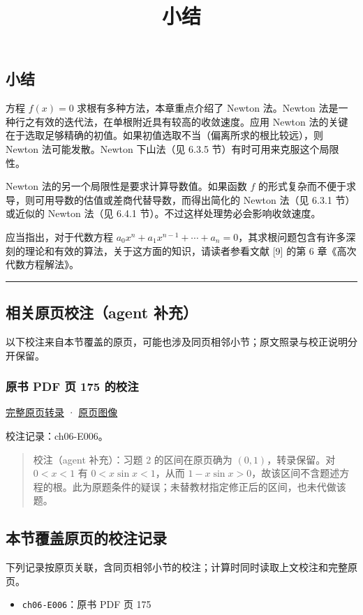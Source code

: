 \documentclass[
  10pt,
  fontset=fandol]{ctexart}
\title{小结}
\author{}
\date{}
\providecommand{\tightlist}{%
  \setlength{\itemsep}{0pt}\setlength{\parskip}{0pt}}
\begin{document}
\maketitle

\subsection{小结}\label{ux5c0fux7ed3}

方程 \(f(x)=0\) 求根有多种方法，本章重点介绍了 Newton 法。Newton 法是一种行之有效的迭代法，在单根附近具有较高的收敛速度。应用 Newton 法的关键在于选取足够精确的初值。如果初值选取不当（偏离所求的根比较远），则 Newton 法可能发散。Newton 下山法（见 6.3.5 节）有时可用来克服这个局限性。

Newton 法的另一个局限性是要求计算导数值。如果函数 \(f\) 的形式复杂而不便于求导，则可用导数的估值或差商代替导数，而得出简化的 Newton 法（见 6.3.1 节）或近似的 Newton 法（见 6.4.1 节）。不过这样处理势必会影响收敛速度。

应当指出，对于代数方程 \(a_0x^n+a_1x^{n-1}+\cdots+a_n=0\)，其求根问题包含有许多深刻的理论和有效的算法，关于这方面的知识，请读者参看文献 {[}9{]} 的第 6 章《高次代数方程解法》。

\begin{center}\rule{0.5\linewidth}{0.5pt}\end{center}

\subsection{相关原页校注（agent 补充）}\label{ux76f8ux5173ux539fux9875ux6821ux6ce8agent-ux8865ux5145}

以下校注来自本节覆盖的原页，可能也涉及同页相邻小节；原文照录与校正说明分开保留。

\subsubsection{原书 PDF 页 175 的校注}\label{ux539fux4e66-pdf-ux9875-175-ux7684ux6821ux6ce8}

\href{../pages/pdf-175.md}{完整原页转录} · \href{../../source-images/pdf-175.jpeg}{原页图像}

校注记录：ch06-E006。

\begin{quote}
校注（agent 补充）：习题 2 的区间在原页确为 \((0,1)\)，转录保留。对 \(0<x<1\) 有 \(0<x\sin x<1\)，从而 \(1-x\sin x>0\)，故该区间不含题述方程的根。此为原题条件的疑误；未替教材指定修正后的区间，也未代做该题。
\end{quote}

\subsection{本节覆盖原页的校注记录}\label{ux672cux8282ux8986ux76d6ux539fux9875ux7684ux6821ux6ce8ux8bb0ux5f55}

下列记录按原页关联，含同页相邻小节的校注；计算时同时读取上文校注和完整原页。

\begin{itemize}
\tightlist
\item
  \texttt{ch06-E006}：原书 PDF 页 175
\end{itemize}
\end{document}

